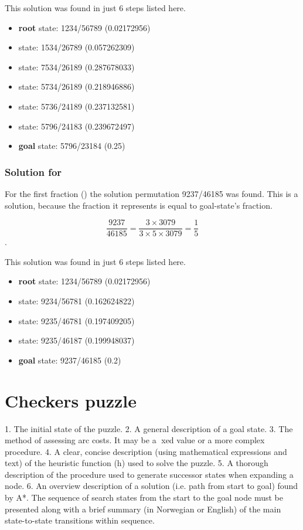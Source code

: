 \documentclass{article}
\begin{document}
This solution was found in just 6 steps listed here.

\begin{itemize}
  \item \textbf{root} state: 1234/56789 (0.02172956) 
  \item state: 1534/26789 (0.057262309)
  \item state: 7534/26189 (0.287678033)
  \item state: 5734/26189 (0.218946886)
  \item state: 5736/24189 (0.237132581)
  \item state: 5796/24183 (0.239672497)
  \item \textbf{goal} state: 5796/23184 (0.25)
\end{itemize}

\subsubsection{Solution for }

For the first fraction () the solution permutation 9237/46185 was
found. This is a solution, because the fraction it represents is equal to
goal-state's fraction.

\[\frac{9237}{46185} = \frac{3 \times 3079}{3 \times 5 \times 3079}
= \frac{1}{5}\].

This solution was found in just 6 steps listed here.

\begin{itemize}
  \item \textbf{root} state: 1234/56789 (0.02172956) 
  \item state: 9234/56781 (0.162624822)
  \item state: 9235/46781 (0.197409205)
  \item state: 9235/46187 (0.199948037)
  \item \textbf{goal} state: 9237/46185 (0.2)
\end{itemize}

\section{Checkers puzzle}

1. The initial state of the puzzle.
2. A general description of a goal state.
3. The method of assessing arc costs. It may be a xed value or a more complex procedure.
4. A clear, concise description (using mathematical expressions and text) of the heuristic function (h)
used to solve the puzzle.
5. A thorough description of the procedure used to generate successor states when expanding a node.
6. An overview description of a solution (i.e. path from start to goal) found by A*. The sequence of search
states from the start to the goal node must be presented along with a brief summary (in Norwegian or
English) of the main state-to-state transitions within sequence.
\end{document}
